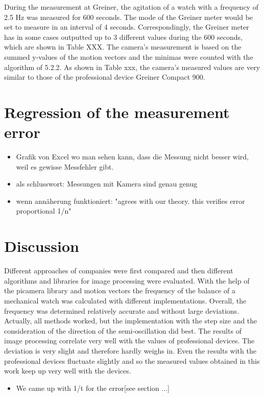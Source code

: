 \documentclass[12pt, a4paper]{report}
\begin{document}
    During the measurement at Greiner, the agitation of a watch with a frequency of 2.5 Hz was measured for 600 seconds. The mode of the Greiner meter would be set to measure in an interval of 4 seconds. Correspondingly, the Greiner meter has in some cases outputted up to 3 different values during the 600 seconds, which are shown in Table XXX. The camera's measurement is based on the summed y-values of the motion vectors and the minimas were counted with the algorithm of 5.2.2.
    As shown in Table xxx, the camera's measured values are very similar to those of the professional device Greiner Compact 900.
         
    \chapter{Regression of the measurement error}
    \begin{itemize}
        \item Grafik von Excel wo man sehen kann, dass die Messung nicht besser wird, weil es gewisse Messfehler gibt. 
      \item als schlusswort: Messungen mit Kamera sind genau genug
      \item wenn annäherung funktioniert: "agrees with our theory. this verifies error proportional 1/n"
      \end{itemize}
    
    
    \chapter{Discussion}
    Different approaches of companies were first compared and then different algorithms and libraries for image processing were evaluated. 
    With the help of the picamera library and motion vectors the frequency of the balance of a mechanical watch was calculated with different implementations. Overall, the frequency was determined relatively accurate and without large deviations. Actually, all methods worked, but the implementation with the step size and the consideration of the direction of the semi-oscillation did best.
    The results of image processing correlate very well with the values of professional devices. The deviation is very slight and therefore hardly weighs in. Even the results with the professional devices fluctuate slightly and so the measured values obtained in this work keep up very well with the devices.
             \begin{itemize}
    \item We came up with 1/t  for the error[see section ...]
    \end{itemize}
    
\end{document}
